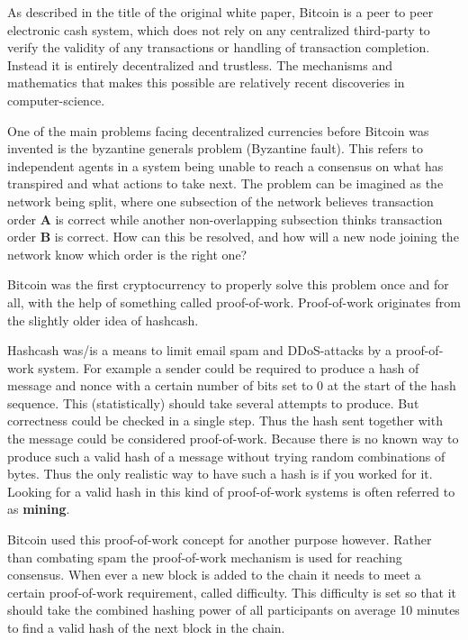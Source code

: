 As described in the title of the original white paper, Bitcoin is a peer to peer electronic cash system, which does not rely on any centralized third-party to verify the validity of any transactions or handling of transaction completion.\cite{nakamoto_bitcoin} Instead it is entirely decentralized and trustless. The mechanisms and mathematics that makes this possible are relatively recent discoveries in computer-science. 


One of the main problems facing decentralized currencies before Bitcoin was invented is the byzantine generals problem (Byzantine fault)\cite{lamport_shostak_pease_1982}. This refers to independent agents in a system being unable to reach a consensus on what has transpired and what actions to take next. The problem can be imagined as the network being split, where one subsection of the network believes transaction order \textbf{A} is correct while another non-overlapping subsection thinks transaction order \textbf{B} is correct. How can this be resolved, and how will a new node joining the network know which order is the right one?

Bitcoin was the first cryptocurrency to properly solve this problem once and for all, with the help of something called proof-of-work. Proof-of-work originates from the slightly older idea of hashcash.\cite{hashcash}

Hashcash was/is a means to limit email spam and DDoS-attacks by a proof-of-work system. For example a sender could be required to produce a hash of message and nonce with a certain number of bits set to 0 at the start of the hash sequence. This (statistically) should take several attempts to produce. But correctness could be checked in a single step. Thus the hash sent together with the message could be considered proof-of-work. Because there is no known way to produce such a valid hash of a message without trying random combinations of bytes. Thus the only realistic way to have such a hash is if you worked for it.\cite{hashcash} Looking for a valid hash in this kind of proof-of-work systems is often referred to as \textbf{mining}.

Bitcoin used this proof-of-work concept for another purpose however. Rather than combating spam the proof-of-work mechanism is used for reaching consensus. When ever a new block is added to the chain it needs to meet a certain proof-of-work requirement, called difficulty. This difficulty is set so that it should take the combined hashing power of all participants on average 10 minutes to find a valid hash of the next block in the chain.\cite{nakamoto_bitcoin}\cite{antonopoulos_2017}

